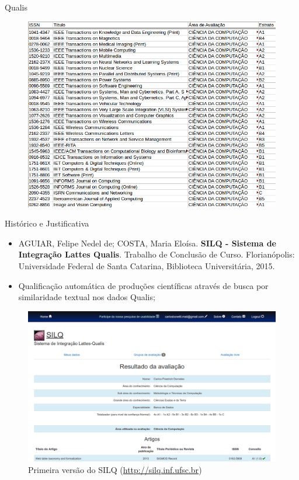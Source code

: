 \documentclass{beamer}
\begin{document}
\begin{frame}{Qualis}
  \begin{figure}
    \includegraphics[scale=0.4]{figuras/qualis_exemplo.png}
  \end{figure}
\end{frame}

\begin{frame}{Histórico e Justificativa}
  \begin{itemize}
    \item AGUIAR, Felipe Nedel de; COSTA, Maria Eloísa. \textbf{SILQ - Sistema de Integração Lattes Qualis}. Trabalho de Conclusão de Curso. Florianópolis: Universidade Federal de Santa Catarina, Biblioteca Universitária, 2015.
    \item Qualificação automática de produções científicas através de busca por similaridade textual nos dados Qualis;
  \end{itemize}
\end{frame}

\begin{frame}
  \begin{figure}
    \includegraphics[width=\textwidth]{figuras/silq1-3.png}
    \caption{Primeira versão do SILQ (\url{http://silq.inf.ufsc.br})}
  \end{figure}
\end{frame}
\end{document}
